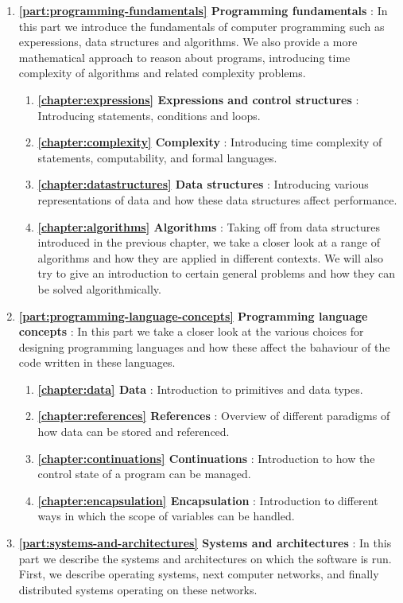 \begin{enumerate}[]
	\item \textbf{\autoref{part:programming-fundamentals} Programming fundamentals} : In this part we introduce the fundamentals of computer programming such as experessions, data structures and algorithms. We also provide a more mathematical approach to reason about programs, introducing time complexity of algorithms and related complexity problems.
		\begin{enumerate}[]
			\item \textbf{\autoref{chapter:expressions} Expressions and control structures} : Introducing statements, conditions and loops.
			\item \textbf{\autoref{chapter:complexity} Complexity} : Introducing time complexity of statements, computability, and formal languages.
			\item \textbf{\autoref{chapter:datastructures} Data structures} : Introducing various representations of data and how these data structures affect performance.
			\item \textbf{\autoref{chapter:algorithms} Algorithms} : Taking off from data structures introduced in the previous chapter, we take a closer look at a range of algorithms and how they are applied in different contexts. We will also try to give an introduction to certain general problems and how they can be solved algorithmically.
		\end{enumerate}
	\item \textbf{\autoref{part:programming-language-concepts} Programming language concepts} : In this part we take a closer look at the various choices for designing programming languages and how these affect the bahaviour of the code written in these languages.
		\begin{enumerate}[]
			\item \textbf{\autoref{chapter:data} Data} : Introduction to primitives and data types.
			\item \textbf{\autoref{chapter:references} References} : Overview of different paradigms of how data can be stored and referenced.
			\item \textbf{\autoref{chapter:continuations} Continuations} : Introduction to how the control state of a program can be managed.
			\item \textbf{\autoref{chapter:encapsulation} Encapsulation} : Introduction to different ways in which the scope of variables can be handled.
		\end{enumerate}
	\item \textbf{\autoref{part:systems-and-architectures} Systems and architectures} : In this part we describe the systems and architectures on which the software is run. First, we describe operating systems, next computer networks, and finally distributed systems operating on these networks.

\end{enumerate}
